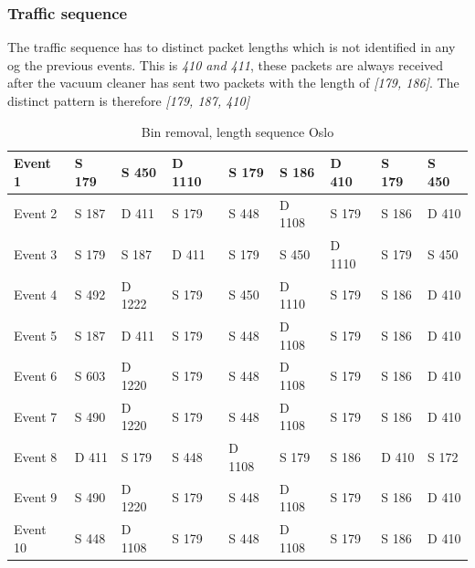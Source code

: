 \subsubsection{Traffic sequence}
The traffic sequence has to distinct packet lengths which is not identified in any og the previous events. This is \textit{410 and 411}, these packets are always received after the vacuum cleaner has sent two packets with the length of \textit{[179, 186]}. The distinct pattern is therefore \textit{[179, 187, 410]}
\begin{table}[H]
\centering
\caption{Bin removal, length sequence Oslo}
\label{tab:BRSquenceOslo}
\begin{tabular}{|l|l|l|l|l|l|l|l|l|}
\hline
Event 1  & S 179   & S 450  & D 1110 & S 179  & S 186  & D 410  & S 179 & S 450 \\ \hline
Event 2  & S   187 & D 411  & S 179  & S 448  & D 1108 & S 179  & S 186 & D 410 \\ \hline
Event 3  & S   179 & S 187  & D 411  & S 179  & S 450  & D 1110 & S 179 & S 450 \\ \hline
Event 4  & S   492 & D 1222 & S 179  & S 450  & D 1110 & S 179  & S 186 & D 410 \\ \hline
Event 5  & S   187 & D 411  & S 179  & S 448  & D 1108 & S 179  & S 186 & D 410 \\ \hline
Event 6  & S 603   & D 1220 & S 179  & S 448  & D 1108 & S 179  & S 186 & D 410 \\ \hline
Event 7  & S   490 & D 1220 & S 179  & S 448  & D 1108 & S 179  & S 186 & D 410 \\ \hline
Event 8  & D   411 & S 179  & S 448  & D 1108 & S 179  & S 186  & D 410 & S 172 \\ \hline
Event 9  & S   490 & D 1220 & S 179  & S 448  & D 1108 & S 179  & S 186 & D 410 \\ \hline
Event 10 & S   448 & D 1108 & S 179  & S 448  & D 1108 & S 179  & S 186 & D 410 \\ \hline
\end{tabular}
\end{table}


